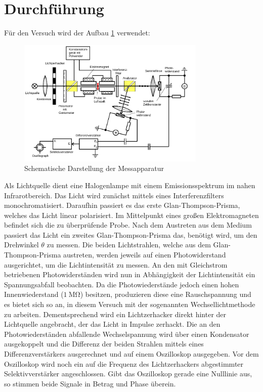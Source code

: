 \section{Durchführung}
\label{sec:Durchführung}

Für den Versuch wird der Aufbau \ref{fig:Bild2} verwendet:
\begin{figure}
	\centering
	\includegraphics[width=0.8\textwidth]{pictures/aufbau.png}
	\caption{Schematische Darstellung der Messapparatur \cite{Anleitung}}
	\label{fig:Bild2}
\end{figure}
Als Lichtquelle dient eine Halogenlampe mit einem Emissionsspektrum im nahen Infrarotbereich.
Das Licht wird zunächst mittels eines Interferenzfilters monochromatisiert.
Daraufhin passiert es das erste Glan-Thompson-Prisma, welches das Licht linear polarisiert.
Im Mittelpunkt eines großen Elektromagneten befindet sich die zu überprüfende Probe.
Nach dem Austreten aus dem Medium passiert das Licht ein zweites Glan-Thompson-Prisma das,
benötigt wird, um den Drehwinkel $\theta$ zu messen. Die beiden Lichtstrahlen, welche aus dem
Glan-Thompson-Prisma austreten, werden jeweils auf einen Photowiderstand ausgerichtet, um die
Lichtintensität zu messen. An den mit Gleichstrom betriebenen Photowiderständen wird nun in
Abhängigkeit der Lichtintensität ein Spannungsabfall beobachten. Da die Photowiederstände jedoch
einen hohen Innenwiederstand ($\SI{1}{\mega\ohm}$) besitzen, produzieren diese eine
Rauschspannung und es bietet sich so an, in diesem Versuch mit der sogenannten
Wechsellichtmethode zu arbeiten. Dementsprechend wird ein Lichtzerhacker direkt hinter der
Lichtquelle angebracht, der das Licht in Impulse zerhackt. Die an den Photowiederständen
abfallende Wechselspannung wird über einen Kondensator ausgekoppelt und die Differenz der
beiden Strahlen mittels eines Differenzverstärkers ausgerechnet und auf einem Oszilloskop
ausgegeben. Vor dem Oszilloskop wird noch ein auf die Frequenz des Lichtzerhackers abgestimmter
Selektivverstärker angeschlossen. Gibt das Oszilloskop gerade eine Nulllinie aus, so stimmen beide Signale in Betrag und Phase überein.
